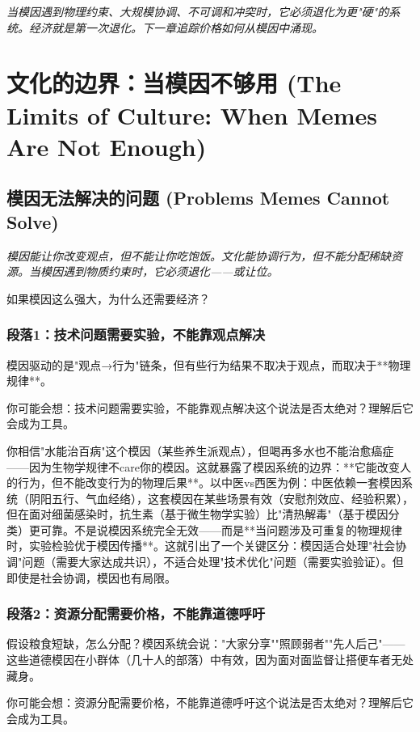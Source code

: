 \documentclass[a4paper,12pt]{book}
\newenvironment{motivation}{\begin{tcolorbox}[colback=gray!10,colframe=gray!60,title=\textit{动机}]\small\itshape}{\end{tcolorbox}}
\newenvironment{questionbox}{\begin{tcolorbox}[colback=red!3,colframe=red!60]}{\end{tcolorbox}}
\begin{document}
\begin{motivation}
\begin{motivation}
\begin{motivation}
当模因遇到物理约束、大规模协调、不可调和冲突时，它必须退化为更"硬"的系统。经济就是第一次退化。下一章追踪价格如何从模因中涌现。


	
	\section{文化的边界：当模因不够用 (The Limits of Culture: When Memes Are Not Enough)}

	\subsection{模因无法解决的问题 (Problems Memes Cannot Solve)}
	\begin{motivation}
		模因能让你改变观点，但不能让你吃饱饭。文化能协调行为，但不能分配稀缺资源。当模因遇到物质约束时，它必须退化——或让位。
	\end{motivation}
	\begin{questionbox}
		如果模因这么强大，为什么还需要经济？
	\end{questionbox}

	\subsubsection*{段落1：技术问题需要实验，不能靠观点解决}
	模因驱动的是"观点→行为"链条，但有些行为结果不取决于观点，而取决于**物理规律**。
	\begin{tcolorbox}[colback=yellow!5, title=\textit{读者行为预测}]
		你可能会想：技术问题需要实验，不能靠观点解决这个说法是否太绝对？理解后它会成为工具。
	\end{tcolorbox}

你相信"水能治百病"这个模因（某些养生派观点），但喝再多水也不能治愈癌症——因为生物学规律不care你的模因。这就暴露了模因系统的边界：**它能改变人的行为，但不能改变行为的物理后果**。以中医vs西医为例：中医依赖一套模因系统（阴阳五行、气血经络），这套模因在某些场景有效（安慰剂效应、经验积累），但在面对细菌感染时，抗生素（基于微生物学实验）比"清热解毒"（基于模因分类）更可靠。不是说模因系统完全无效——而是**当问题涉及可重复的物理规律时，实验检验优于模因传播**。这就引出了一个关键区分：模因适合处理"社会协调"问题（需要大家达成共识），不适合处理"技术优化"问题（需要实验验证）。但即使是社会协调，模因也有局限。

	\subsubsection*{段落2：资源分配需要价格，不能靠道德呼吁}
	假设粮食短缺，怎么分配？模因系统会说："大家分享""照顾弱者""先人后己"——这些道德模因在小群体（几十人的部落）中有效，因为面对面监督让搭便车者无处藏身。
	\begin{tcolorbox}[colback=yellow!5, title=\textit{读者行为预测}]
		你可能会想：资源分配需要价格，不能靠道德呼吁这个说法是否太绝对？理解后它会成为工具。
	\end{tcolorbox}


\end{motivation}
\end{motivation}
\end{motivation}
\end{document}
